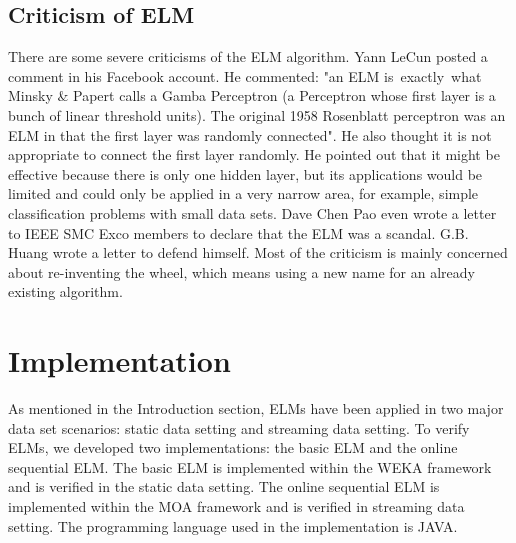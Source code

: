 \documentclass[a4paper, 14pt]{extarticle}
\begin{document}
\subsection{Criticism of ELM}
There are some severe criticisms of the ELM algorithm. Yann LeCun posted a comment in his Facebook account\cite{YannLecun}. He commented: "an ELM is exactly what Minsky \& Papert calls a Gamba Perceptron (a Perceptron whose first layer is a bunch of linear threshold units). The original 1958 Rosenblatt perceptron was an ELM in that the first layer was randomly connected". He also thought it is not appropriate to connect the first layer randomly. He pointed out that it might be effective because there is only one hidden layer, but its applications would be limited and could only be applied in a very narrow area, for example, simple classification problems with small data sets. Dave Chen Pao even wrote a letter to IEEE SMC Exco members to declare that the ELM was a scandal\cite{DaveChenPao}. G.B. Huang wrote a letter to defend himself\cite{Huang2015}. Most of the criticism is mainly concerned about re-inventing the wheel, which means using a new name for an already existing algorithm. 
\newpage
\section{Implementation}
\par As mentioned in the Introduction section, ELMs have been applied in two major data set scenarios: static data setting and streaming data setting. To verify ELMs, we developed two implementations: the basic ELM and the online sequential ELM. The basic ELM is implemented within the WEKA framework and is verified in the static data setting. The online sequential ELM is implemented within the MOA framework and is verified in streaming data setting. The programming language used in the implementation is JAVA. 
\end{document}
